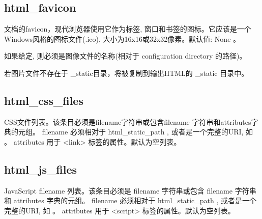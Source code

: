 \documentclass[a4paper,10pt,english]{sphinxmanual}
\begin{document}
\subsection{html\_favicon}
\label{\detokenize{sphinx_conf:html-favicon}}
\sphinxAtStartPar
文档的favicon，现代浏览器使用它作为标签, 窗口和书签的图标。它应该是一个Windows风格的图标文件(.ico), 大小为16x16或32x32像素。默认值: None 。

\sphinxAtStartPar
如果给定, 则必须是图像文件的名称(相对于 configuration directory 的路径)。

\sphinxAtStartPar
若图片文件不存在于 \_static目录，将被复制到输出HTML的 \_static 目录中。


\subsection{html\_css\_files}
\label{\detokenize{sphinx_conf:html-css-files}}
\sphinxAtStartPar
CSS文件列表。该条目必须是filename字符串或包含filename 字符串和attributes字典的元组。
filename 必须相对于 html\_static\_path , 或者是一个完整的URI, 如  。
attributes 用于 <link> 标签的属性。默认为空列表。

\begin{sphinxVerbatim}[commandchars=\\\{\}]
  \PYG{p}{[}
            \PYG{p}{]}
\end{sphinxVerbatim}


\subsection{html\_js\_files}
\label{\detokenize{sphinx_conf:html-js-files}}
\sphinxAtStartPar
JavaScript filename 列表。该条目必须是 filename 字符串或包含 filename 字符串和 attributes 字典的元组。
filename 必须相对于 html\_static\_path , 或者是一个完整的URI, 如  。
attributes 用于 <script> 标签的属性。默认为空列表。

\begin{sphinxVerbatim}[commandchars=\\\{\}]
  \PYG{p}{[}
               \PYG{p}{]}
\end{sphinxVerbatim}
\end{document}
